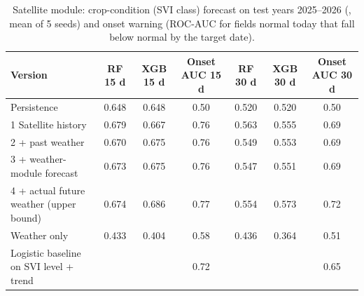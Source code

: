 \begin{table}[H]
\centering
\caption{Satellite module: crop-condition (SVI class) forecast on test years 2025--2026 (\mf, mean of 5 seeds) and onset warning (ROC-AUC for fields normal today that fall below normal by the target date).}
\label{tab:s_forecast}
\footnotesize
\begin{tabular}{@{}lcccccc@{}}
\toprule
\textbf{Version} & \textbf{RF 15 d} & \textbf{XGB 15 d} & \textbf{Onset AUC 15 d} & \textbf{RF 30 d} & \textbf{XGB 30 d} & \textbf{Onset AUC 30 d} \\
\midrule
Persistence & 0.648 & 0.648 & 0.50 & 0.520 & 0.520 & 0.50 \\
1\; Satellite history & 0.679 & 0.667 & 0.76 & 0.563 & 0.555 & 0.69 \\
2\; + past weather & 0.670 & 0.675 & 0.76 & 0.549 & 0.553 & 0.69 \\
3\; + weather-module forecast & 0.673 & 0.675 & 0.76 & 0.547 & 0.551 & 0.69 \\
4\; + actual future weather (upper bound) & 0.674 & 0.686 & 0.77 & 0.554 & 0.573 & 0.72 \\
Weather only & 0.433 & 0.404 & 0.58 & 0.436 & 0.364 & 0.51 \\
Logistic baseline on SVI level + trend &  &  & 0.72 &  &  & 0.65 \\
\bottomrule
\end{tabular}
\end{table}
